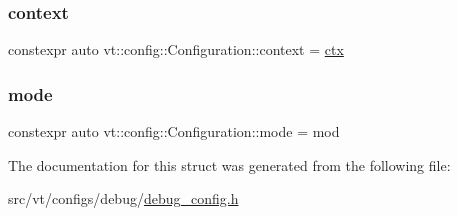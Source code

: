 \subsubsection{\texorpdfstring{context}{context}}
{\footnotesize\ttfamily constexpr auto vt\+::config\+::\+Configuration\+::context = \hyperlink{namespacevt_1_1config_a0551245b6b893932b95aaf8eac94eed1}{ctx}\hspace{0.3cm}{\ttfamily [static]}}

\mbox{\label{structvt_1_1config_1_1_configuration_afaa170a7f047944c3ba69cc3aa624ab0}} 
\subsubsection{\texorpdfstring{mode}{mode}}
{\footnotesize\ttfamily constexpr auto vt\+::config\+::\+Configuration\+::mode = mod\hspace{0.3cm}{\ttfamily [static]}}



The documentation for this struct was generated from the following file\+:\begin{DoxyCompactItemize}
\item 
src/vt/configs/debug/\hyperlink{debug__config_8h}{debug\+\_\+config.\+h}\end{DoxyCompactItemize}

